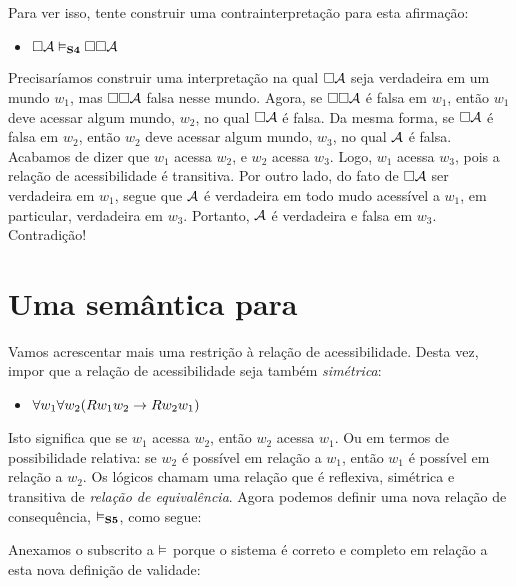 Para ver isso,  tente construir uma contrainterpretação para esta afirmação:
\begin{itemize}
	\item[]$\Box\mathcal{A} \vDash_{\mathbf{S4}} \Box \Box \mathcal{A}$
\end{itemize}
Precisaríamos construir uma interpretação na qual $\Box\mathcal{A}$ seja verdadeira em um mundo  $w_1$, mas  $\Box \Box \mathcal{A}$  falsa nesse mundo. Agora, se $\Box \Box \mathcal{A}$  é falsa em  $w_1$, então  $w_1$ deve acessar algum mundo, $w_2$, no qual $\Box\mathcal{A}$ é falsa. Da mesma forma, se $\Box \mathcal{A}$ é falsa em $w_2$, então $w_2$ deve acessar algum mundo, $w_3$, no qual $\mathcal{A}$ é falsa. Acabamos de dizer que  $w_1$ acessa $w_2$, e $w_2$ acessa $w_3$. Logo,  $w_1$ acessa $w_3$, pois a relação de acessibilidade é  transitiva.  Por outro lado, do fato de $\Box\mathcal{A}$  ser verdadeira em $w_1$, segue que   $\mathcal{A}$  é verdadeira em todo mudo acessível a $w_1$, em particular, verdadeira em $w_3$.  Portanto, $\mathcal{A}$ é verdadeira e falsa em $w_3$. Contradição!

\section{Uma semântica para  \mlSfive}
\label{SemanticsS5}

Vamos acrescentar mais uma restrição à relação de acessibilidade. Desta vez, impor que a relação de acessibilidade seja também \emph{simétrica}:
\begin{itemize}
	\item $\forall w_1\forall w_2(Rw_1w_2 \rightarrow Rw_2w_1)$
\end{itemize}
Isto significa que se  $w_1$ acessa $w_2$, então $w_2$ acessa  $w_1$. Ou em termos de possibilidade relativa: se $w_2$ é possível em relação a  $w_1$, então  $w_1$ é possível em relação a $w_2$. Os lógicos chamam uma relação que é reflexiva, simétrica e transitiva de \emph{relação de equivalência}. Agora podemos  definir uma nova relação de consequência, $\vDash_{\mathbf{S5}} $, como segue:

Anexamos o subscrito \mlSfive{} a $\vDash$ porque  o sistema \mlSfive{} é correto e completo em relação a esta nova definição de validade:

